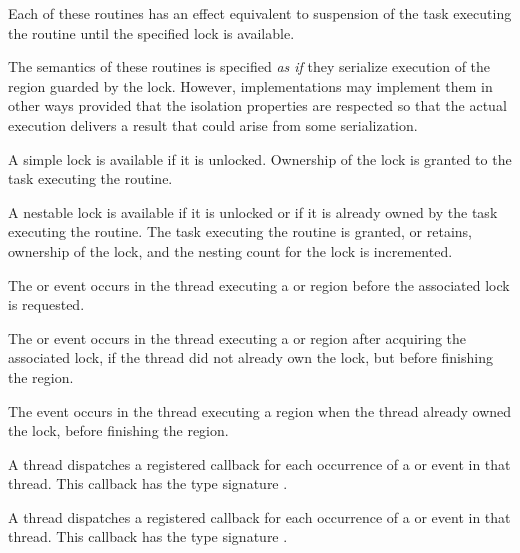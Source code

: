 \effect
Each of these routines has an effect equivalent to suspension of the task
executing the routine until the specified lock is available. 


\begin{note} The semantics of these routines is specified
\emph{as if} they serialize execution of the region guarded by the
lock. However, implementations may implement them in other ways
provided that the isolation properties are respected so that the
actual execution delivers a result that could arise from some
serialization. 
\end{note}

A simple lock is available if it is unlocked. Ownership of the lock is 
granted to the task executing the routine.

A nestable lock is available if it is unlocked or if it is already owned by 
the task executing the routine. The task executing the routine is granted, 
or retains, ownership of the lock, and the nesting count for the lock is 
incremented.

\events

The  or  event occurs in the thread 
executing a  or  region
before the associated lock is requested.

The  or  event occurs in the thread 
executing a  or  region
after acquiring the associated lock, if the thread did not already own the lock, 
but before finishing the region.

The  event occurs in the thread 
executing a  region
when the thread already owned the lock, 
before finishing the region.


\tools

A thread dispatches a registered 
callback for each occurrence of a  or  event 
in that thread.  This callback has the type signature .

A thread dispatches a registered 
callback for each occurrence of a  or  event 
in that thread.  This callback has the type signature .

